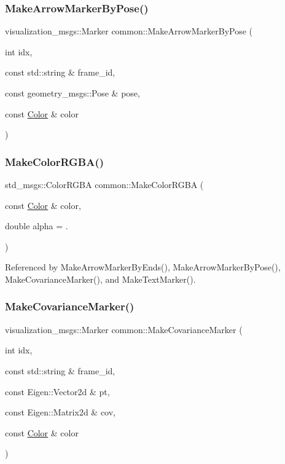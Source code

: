 \subsubsection{\texorpdfstring{Make\+Arrow\+Marker\+By\+Pose()}{MakeArrowMarkerByPose()}}
{\footnotesize\ttfamily visualization\+\_\+msgs\+::\+Marker common\+::\+Make\+Arrow\+Marker\+By\+Pose (\begin{DoxyParamCaption}\item[{int}]{idx,  }\item[{const std\+::string \&}]{frame\+\_\+id,  }\item[{const geometry\+\_\+msgs\+::\+Pose \&}]{pose,  }\item[{const \hyperlink{namespacecommon_a325f61d2a1dcd20782fbb1421c0c3631}{Color} \&}]{color }\end{DoxyParamCaption})}

\mbox{\label{namespacecommon_a1536d9969a0d06faf584e616bd12ca08}} 
\subsubsection{\texorpdfstring{Make\+Color\+R\+G\+B\+A()}{MakeColorRGBA()}}
{\footnotesize\ttfamily std\+\_\+msgs\+::\+Color\+R\+G\+BA common\+::\+Make\+Color\+R\+G\+BA (\begin{DoxyParamCaption}\item[{const \hyperlink{namespacecommon_a325f61d2a1dcd20782fbb1421c0c3631}{Color} \&}]{color,  }\item[{double}]{alpha = {.} }\end{DoxyParamCaption})}



Referenced by Make\+Arrow\+Marker\+By\+Ends(), Make\+Arrow\+Marker\+By\+Pose(), Make\+Covariance\+Marker(), and Make\+Text\+Marker().

\mbox{\label{namespacecommon_a61576f8134edf708a3d72a842db21413}} 
\subsubsection{\texorpdfstring{Make\+Covariance\+Marker()}{MakeCovarianceMarker()}}
{\footnotesize\ttfamily visualization\+\_\+msgs\+::\+Marker common\+::\+Make\+Covariance\+Marker (\begin{DoxyParamCaption}\item[{int}]{idx,  }\item[{const std\+::string \&}]{frame\+\_\+id,  }\item[{const Eigen\+::\+Vector2d \&}]{pt,  }\item[{const Eigen\+::\+Matrix2d \&}]{cov,  }\item[{const \hyperlink{namespacecommon_a325f61d2a1dcd20782fbb1421c0c3631}{Color} \&}]{color }\end{DoxyParamCaption})}

